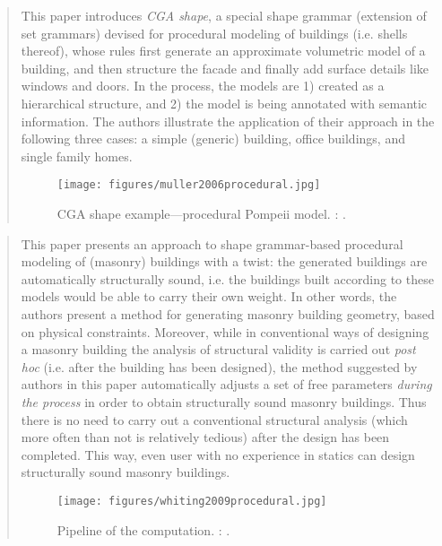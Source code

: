 
		\begin{quote}
		\small
		This paper introduces {\em CGA shape}, a special shape grammar (extension of set grammars) 
		devised for procedural modeling of buildings (i.e. shells thereof), 
		whose rules first generate an approximate volumetric model of a building,
		and then structure the facade and finally add surface details like windows and doors.
		In the process, the models are 1) created as a hierarchical structure, and
		2) the model is being annotated with semantic information. The authors
		illustrate the application of their approach in the following three cases:
		a simple (generic) building, office buildings, and single family homes.
		\begin{figure}[htb]
		\centering
		\texttt{[image: figures/muller2006procedural.jpg]}
		\caption{
		CGA shape example---procedural Pompeii model.
		\citeauthor{muller2006procedural}: 
		\cite{muller2006procedural}.}
		\label{fig:muller2006procedural}
		\end{figure}
		
		\end{quote}


		\begin{quote}
		\small
		This paper presents an approach to shape grammar-based 
		procedural modeling of (masonry) buildings with a twist:
		the generated buildings are automatically structurally sound, i.e. the buildings built according
		to these models would be able to carry their own weight.
		In other words, the authors
		present a method for generating masonry building geometry, based on physical constraints. 
		Moreover, while in conventional 
		ways of designing a masonry building the analysis of structural validity is carried out 
		{\em post hoc} (i.e. after the building has been designed), the method suggested
		by authors in this paper automatically adjusts a set of free parameters {\em during the process}
		in order to obtain structurally sound masonry buildings. 
		Thus there is no need
		to carry out a conventional structural analysis (which more often than not is relatively
		tedious) after the design has been completed. This way, even user with no experience
		in statics can design structurally sound masonry buildings.
		
		\begin{figure}[htb]
		\centering
		\texttt{[image: figures/whiting2009procedural.jpg]}
		\caption{
		Pipeline of the computation.
		\citeauthor{whiting2009procedural}: 
		\cite{whiting2009procedural}.}
		\label{fig:whiting2009procedural}
		\end{figure}
		
		\end{quote}

